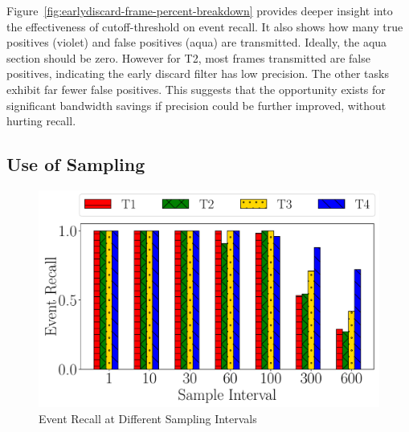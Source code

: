 Figure~\ref{fig:earlydiscard-frame-percent-breakdown} provides deeper insight
into the effectiveness of cutoff-threshold on event recall. It also shows how
many true positives (violet) and false positives (aqua) are
transmitted. Ideally, the aqua section should be zero.  However for T2, most
frames transmitted are false positives, indicating the early discard filter has
low precision.  The other tasks exhibit far fewer false positives.  This
suggests that the opportunity exists for significant bandwidth savings if
precision could be further improved, without hurting recall.


\subsection{Use of Sampling}

\begin{figure}
    \centering
    \includegraphics[width=\linewidth]{FIGS/fig-random-select-interval-recall-hatch.pdf}
\caption{Event Recall at Different Sampling Intervals}
\label{fig:sampling-only}
\end{figure}



